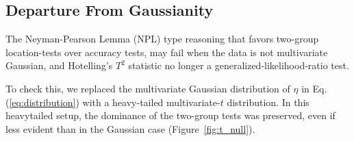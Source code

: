 \documentclass[onecolumn,draftclsnofoot]{IEEEtran}
\begin{document}
%
%
%
%
%


\subsection{Departure From Gaussianity}
The Neyman-Pearson Lemma (NPL) type reasoning that favors two-group location-tests over accuracy tests, may fail when the data is not multivariate Gaussian, and Hotelling's $T^2$ statistic no longer a generalized-likelihood-ratio test. 

To check this, we replaced the multivariate Gaussian distribution of $\eta$ in Eq.(\ref{eq:distribution}) with a heavy-tailed multivariate-$t$ distribution. 
In this heavytailed setup, the dominance of the two-group tests was preserved, even if less evident than in the Gaussian case (Figure~\ref{fig:t_null}).
\end{document}

